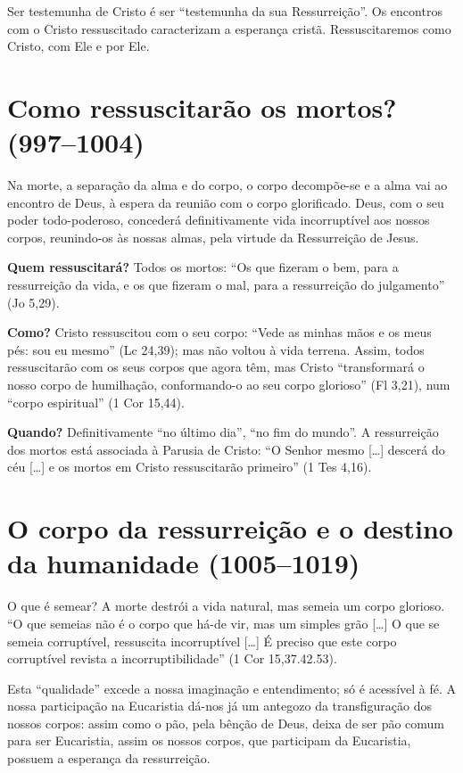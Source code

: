 Ser testemunha de Cristo é ser ``testemunha da sua Ressurreição''. Os encontros com o Cristo ressuscitado caracterizam a esperança cristã. Ressuscitaremos como Cristo, com Ele e por Ele.

\section{Como ressuscitarão os mortos? (997--1004)}

Na morte, a separação da alma e do corpo, o corpo decompõe-se e a alma vai ao encontro de Deus, à espera da reunião com o corpo glorificado. Deus, com o seu poder todo-poderoso, concederá definitivamente vida incorruptível aos nossos corpos, reunindo-os às nossas almas, pela virtude da Ressurreição de Jesus.

\textbf{Quem ressuscitará?} Todos os mortos: ``Os que fizeram o bem, para a ressurreição da vida, e os que fizeram o mal, para a ressurreição do julgamento'' (Jo 5,29).

\textbf{Como?} Cristo ressuscitou com o seu corpo: ``Vede as minhas mãos e os meus pés: sou eu mesmo'' (Lc 24,39); mas não voltou à vida terrena. Assim, todos ressuscitarão com os seus corpos que agora têm, mas Cristo ``transformará o nosso corpo de humilhação, conformando-o ao seu corpo glorioso'' (Fl 3,21), num ``corpo espiritual'' (1 Cor 15,44).

\textbf{Quando?} Definitivamente ``no último dia'', ``no fim do mundo''. A ressurreição dos mortos está associada à Parusia de Cristo: ``O Senhor mesmo [\ldots] descerá do céu [\ldots] e os mortos em Cristo ressuscitarão primeiro'' (1 Tes 4,16).

\section{O corpo da ressurreição e o destino da humanidade (1005--1019)}

O que é semear? A morte destrói a vida natural, mas semeia um corpo glorioso. ``O que semeias não é o corpo que há-de vir, mas um simples grão [\ldots] O que se semeia corruptível, ressuscita incorruptível [\ldots] É preciso que este corpo corruptível revista a incorruptibilidade'' (1 Cor 15,37.42.53).

Esta ``qualidade'' excede a nossa imaginação e entendimento; só é acessível à fé. A nossa participação na Eucaristia dá-nos já um antegozo da transfiguração dos nossos corpos: assim como o pão, pela bênção de Deus, deixa de ser pão comum para ser Eucaristia, assim os nossos corpos, que participam da Eucaristia, possuem a esperança da ressurreição.

